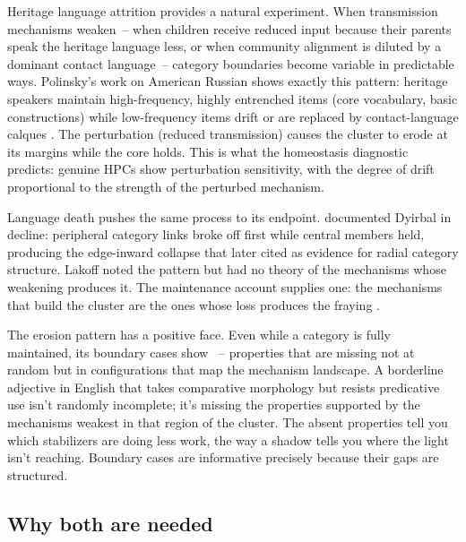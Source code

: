 Heritage language attrition provides a natural experiment. When transmission mechanisms weaken~-- when children receive reduced input because their parents speak the heritage language less, or when community alignment is diluted by a dominant contact language~-- category boundaries become variable in predictable ways. Polinsky's work on American Russian shows exactly this pattern: heritage speakers maintain high-frequency, highly entrenched items (core vocabulary, basic constructions) while low-frequency items drift or are replaced by contact-language calques \autocite{polinsky2018heritage}. The perturbation (reduced transmission) causes the cluster to erode at its margins while the core holds. This is what the homeostasis diagnostic predicts: genuine HPCs show perturbation sensitivity, with the degree of drift proportional to the strength of the perturbed mechanism.

Language death pushes the same process to its endpoint. \textcite{schmidt1985} documented Dyirbal in decline: peripheral category links broke off first while central members held, producing the edge-inward collapse that \textcite[ch.~6]{lakoff1987} later cited as evidence for radial category structure. Lakoff noted the pattern but had no theory of the mechanisms whose weakening produces it. The maintenance account supplies one: the mechanisms that build the cluster are the ones whose loss produces the fraying \citep{reynolds2026metaphor}.

The erosion pattern has a positive face. Even while a category is fully maintained, its boundary cases show ~-- properties that are missing not at random but in configurations that map the mechanism landscape. A borderline adjective in English that takes comparative morphology but resists predicative use isn't randomly incomplete; it's missing the properties supported by the mechanisms weakest in that region of the cluster. The absent properties tell you which stabilizers are doing less work, the way a shadow tells you where the light isn't reaching. Boundary cases are informative precisely because their gaps are structured.

\subsection{Why both are needed}
\label{sec:8:why-both}

